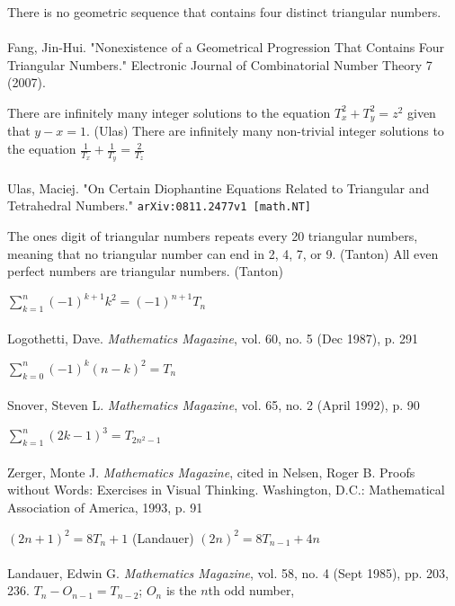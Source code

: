 \documentclass{article}
\begin{document}
\begin{outline}[enumerate]
		\3 There is no geometric sequence that contains four distinct triangular numbers.\\\\
		Fang, Jin-Hui. "Nonexistence of a Geometrical Progression That Contains Four Triangular Numbers." Electronic Journal of Combinatorial Number Theory 7 (2007).
		
		\3 There are infinitely many integer solutions to the equation $T_x^2 + T_y^2 = z^2$ given that $y-x=1$. (Ulas)
		\3 There are infinitely many non-trivial integer solutions to the equation $\frac{1}{T_x} + \frac{1}{T_y} = \frac{2}{T_z}$\\\\ Ulas, Maciej. "On Certain Diophantine Equations Related to Triangular and Tetrahedral Numbers." {\tt arXiv:0811.2477v1 [math.NT]}
		
		\3 The ones digit of triangular numbers repeats every 20 triangular numbers, meaning that no triangular number can end in 2, 4, 7, or 9. (Tanton)
		\3 All even perfect numbers are triangular numbers. (Tanton)
		
		\3 $\sum_{k = 1}^{n} (-1)^{k+1} k^2 = (-1)^{n+1} T_n$ \\\\ Logothetti, Dave. \textit{Mathematics Magazine}, vol. 60, no. 5 (Dec 1987), p. 291
		
		\3 $\sum_{k = 0}^{n} (-1)^k (n-k)^2 = T_n$ \\\\ Snover, Steven L. \textit{Mathematics Magazine}, vol. 65, no. 2 (April 1992), p. 90
		
		\3 $\sum_{k=1}^n (2k-1)^3 = T_{2n^2-1}$ \\\\ Zerger, Monte J. \textit{Mathematics Magazine}, cited in Nelsen, Roger B. Proofs without Words: Exercises in Visual Thinking. Washington, D.C.: Mathematical Association of America, 1993, p. 91
		
		\3 $(2n+1)^2 = 8T_n +1$ (Landauer)
		\3 $(2n)^2 = 8T_{n-1} + 4n$ \\\\ Landauer, Edwin G. \textit{Mathematics Magazine}, vol. 58, no. 4 (Sept 1985), pp. 203, 236.
		\3 $T_n - O_{n-1} = T_{n-2}$; $O_n$ is the $n$th odd number,
		

\end{outline}
\end{document}
